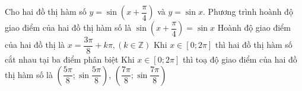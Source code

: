 \begin{ex}%
	 Cho hai đồ thị hàm số $y=\sin\left(x+\dfrac{\pi}{4}\right)$ và $y=\sin x$.
	\choiceTF 
		{\True Phương trình hoành độ giao điểm của hai đồ thị hàm số là $\sin\left(x+\dfrac{\pi}{4}\right)=\sin  x$}
		{\True  Hoành độ giao điểm của hai đồ thị là $x=\dfrac{3\pi}{8}+k\pi, (k\in\mathbb{Z})$}
		{Khi $x\in [0;2\pi]$ thì hai đồ thị hàm số cắt nhau tại  ba điểm phân biệt}
		{\True Khi $x\in [0;2\pi]$ thì toạ độ giao điểm của hai  đồ thị hàm số là $\left(\dfrac{5\pi}{8};\sin\dfrac{5\pi}{8}\right)$, $\left(\dfrac{7\pi}{8};\sin\dfrac{7\pi}{8}\right)$}
\end{ex}

